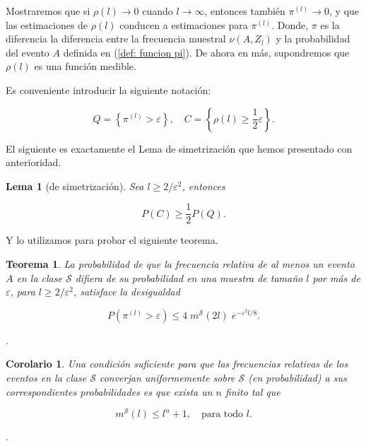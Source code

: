 \documentclass{article}
\newtheorem{thm}{Teorema}[subsection]
\newtheorem{lem}{Lema}[subsection]
\newtheorem{cor}{Corolario}[thm]
\begin{document}
Mostraremos que si \( \rho(l) \to 0 \) cuando \( l \to \infty \), entonces también \( \pi^{(l)} \to 0 \), 
y que las estimaciones de \( \rho(l) \) conducen a estimaciones para \( \pi^{(l)} \). Donde, $\pi$ es la diferencia
la diferencia entre la frecuencia muestral $\nu(A,Z_l)$ y la probabilidad del evento $A$ definida en (\ref{def: funcion pi}).
De ahora en más, supondremos que \( \rho(l) \) es una función medible.\newline

Es conveniente introducir la siguiente notación:

\[
Q = \left\{ \pi^{(l)} > \varepsilon \right\}, \quad C = \left\{ \rho(l) \geq \frac{1}{2}\varepsilon \right\}.
\]

El siguiente es exactamente el Lema de simetrización que hemos presentado con anterioridad.\newline

\begin{lem} [de simetrización]
    Sea \( l \geq 2 / \varepsilon^2 \), entonces

    \[
    P(C) \geq \frac{1}{2} P(Q).
    \]
\end{lem}


Y lo utilizamos para probar el siguiente teorema.\newline

\begin{thm}
    La probabilidad de que la frecuencia relativa de al menos un evento $A$ en la clase \( \mathcal{S} \) difiera de su probabilidad en una 
    muestra de tamaño \( l \) por más de \( \varepsilon \), para \( l \geq 2 / \varepsilon^2 \), satisface la desigualdad  

    \[
    P\left(\pi^{(l)} > \varepsilon\right) \leq 4 \; m^{\mathcal{S}}(2l) \; e^{-\varepsilon^2 l/8}.
    \]  
\end{thm}

.\newline

\begin{cor}
Una condición suficiente para que las frecuencias relativas de los eventos en la clase \( \mathcal{S} \) converjan uniformemente sobre \( \mathcal{S} \) (en probabilidad) a sus correspondientes probabilidades es que exista un \( n \) finito tal que  

\[
m^{\mathcal{S}}(l) \leq l^n + 1, \quad \text{para todo } l.
\]
\end{cor}

.\newline
\end{document}
